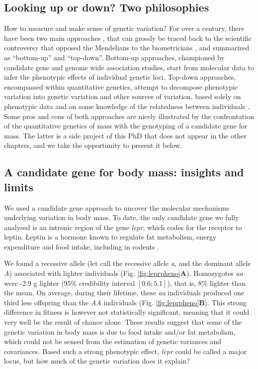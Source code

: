 \subsection{Looking up or down? Two philosophies}
How to measure and make sense of genetic variation?
For over a century, there have been two main approaches \parencite{Liedvogel2012}, that can grossly be traced back to the scientific controversy that opposed the Mendelians to the biometricians \parencite{Dietrich2006}, and summarized as ``bottom-up'' and ``top-down''. 
Bottom-up approaches, championed by candidate gene and genome wide association studies, start from molecular data to infer the phenotypic effects of individual genetic loci. 
Top-down approaches, encompassed within quantitative genetics, attempt to decompose phenotypic variation into genetic variation and other sources of variation, based solely on phenotypic data and on some knowledge of the relatedness between individuals \parencite{Lynch1998}. 
Some pros and cons of both approaches are nicely illustrated by the confrontation of the quantitative genetics of mass with the genotyping of a candidate gene for mass. The latter is a side project of this PhD that does not appear in the other chapters, and we take the opportunity to present it below.

\subsection{A candidate gene for body mass: insights and limits}
We used a candidate gene approach \parencite{Fitzpatrick2005} to uncover the molecular mechanisms underlying variation in body mass. To date, the only candidate gene we fully analysed is an intronic region of the gene \emph{lepr}, which codes for the receptor to leptin. Leptin is a hormone known to regulate fat metabolism, energy expenditure and food intake, including in rodents \parencite{Houseknecht1998}.

We found a recessive allele (let call the recessive allele \emph{a}, and the dominant allele \emph{A}) associated with lighter individuals (Fig. \ref{fig:leprpheno}\textbf{A}). Homozygotes \emph{aa} were -2.9 g lighter (95\% credibility interval $[0.6;5.1]$), that is, 8\% lighter than the mean. On average, during their lifetime, these \emph{aa} individuals produced one third less offspring than the \emph{AA} individuals (Fig. \ref{fig:leprpheno}\textbf{B}). This strong difference in fitness is however not statistically significant, meaning that it could very well be the result of chance alone. These results suggest that some of the genetic variation in body mass is due to food intake and/or fat metabolism, which could not be sensed from the estimation of genetic variances and covariances. 
Based such a strong phenotypic effect, \emph{lepr} could be called a major locus, but how much of the genetic variation does it explain?

